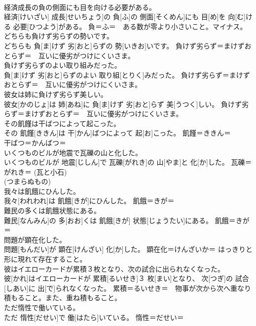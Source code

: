 \documentclass[8pt]{extreport}
\begin{document}
\begin{CJK}{UTF8}{min}
{\\	経済成長の負の側面にも目を向ける必要がある。	
\\	経済[けいざい] 成長[せいちょう]の 負[ふ]の 側面[そくめん]にも 目[め]を 向[む]ける 必要[ひつよう]がある。	負＝ふ＝　ある数が零より小さいこと。マイナス。
\\	どちらも負けず劣らずの勢いです。	
\\	どちらも 負[ま]けず 劣[おと]らずの 勢[いきお]いです。	負けず劣らず＝まけずおとらず＝　互いに優劣がつけにくいさま。
\\	負けず劣らずのよい取り組みだった。	
\\	負[ま]けず 劣[おと]らずのよい 取り組[とりく]みだった。	負けず劣らず＝まけずおとらず＝　互いに優劣がつけにくいさま。
\\	彼女は姉に負けず劣らず美しい。	
\\	彼女[かのじょ]は 姉[あね]に 負[ま]けず 劣[おと]らず 美[うつく]しい。	負けず劣らず＝まけずおとらず＝　互いに優劣がつけにくいさま。
\\	その飢饉は干ばつによって起こった。	
\\	その 飢饉[ききん]は 干[かん]ばつによって 起[お]こった。	飢饉＝ききん＝ 
\\	干ばつ＝かんばつ＝ 
\\	いくつものビルが地震で瓦礫の山と化した。	
\\	いくつものビルが 地震[じしん]で 瓦礫[がれき]の 山[やま]と 化[か]した。	瓦礫＝がれき＝ (瓦と小石) 
\\	(つまらぬもの) 
\\	我々は飢餓にひんした。	
\\	我々[われわれ]は 飢餓[きが]にひんした。	飢餓＝きが＝ 
\\	難民の多くは飢餓状態にある。	
\\	難民[なんみん]の 多[おお]くは 飢餓[きが] 状態[じょうたい]にある。	飢餓＝きが＝ 
\\	問題が顕在化した。	
\\	問題[もんだい]が 顕在[けんざい] 化[か]した。	顕在化＝けんざいか＝ はっきりと形に現れて存在すること。
\\	彼はイエローカードが累積３枚となり、次の試合に出られなくなった。	
\\	彼[かれ]はイエローカードが 累積[るいせき]３ 枚[まい]となり、 次[つぎ]の 試合[しあい]に 出[で]られなくなった。	累積＝るいせき＝　物事が次から次へ重なり積もること。また、重ね積もること。
\\	ただ惰性で働いている。	
\\	ただ 惰性[だせい]で 働[はたら]いている。	惰性＝だせい＝ 
}
\end{CJK}
\end{document}
